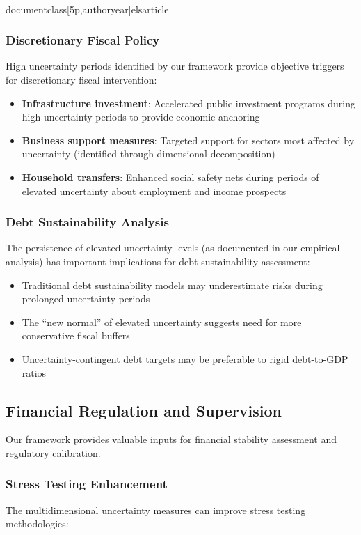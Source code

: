 \\documentclass[5p,authoryear]{elsarticle}
\begin{document}
{\subsubsection{Discretionary Fiscal Policy}
High uncertainty periods identified by our framework provide objective triggers for discretionary fiscal intervention:

\begin{itemize}
    \item \textbf{Infrastructure investment}: Accelerated public investment programs during high uncertainty periods to provide economic anchoring
    \item \textbf{Business support measures}: Targeted support for sectors most affected by uncertainty (identified through dimensional decomposition)
    \item \textbf{Household transfers}: Enhanced social safety nets during periods of elevated uncertainty about employment and income prospects
\end{itemize}

\subsubsection{Debt Sustainability Analysis}
The persistence of elevated uncertainty levels (as documented in our empirical analysis) has important implications for debt sustainability assessment:

\begin{itemize}
    \item Traditional debt sustainability models may underestimate risks during prolonged uncertainty periods
    \item The ``new normal'' of elevated uncertainty suggests need for more conservative fiscal buffers
    \item Uncertainty-contingent debt targets may be preferable to rigid debt-to-GDP ratios
\end{itemize}

\subsection{Financial Regulation and Supervision}

Our framework provides valuable inputs for financial stability assessment and regulatory calibration.

\subsubsection{Stress Testing Enhancement}
The multidimensional uncertainty measures can improve stress testing methodologies:

}
\end{document}
